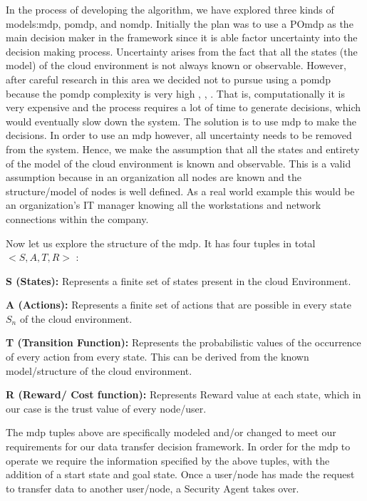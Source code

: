In the process of
developing the algorithm, we have explored three kinds of models:\gls{mdp},
\gls{pomdp}, and \gls{nomdp}. Initially the plan was to use a PO\gls{mdp} as the 
main decision maker in the
framework since it is able factor uncertainty into the decision making process.
Uncertainty arises from the fact that all the states (the model) of the cloud
environment is not always known or observable. However, after careful research
in this area we decided not to pursue using a \gls{pomdp} because the
\gls{pomdp} complexity
is very high \autocite{LeslieP.Kaelbling1998}, \autocite{Zilberman},
\autocite{DongNguyen2009}. 
That is, computationally it is very expensive and the
process requires a lot of time to generate decisions, which would eventually
slow down the system. The solution is to use \gls{mdp} to make the decisions. In order
to use an \gls{mdp} however, all uncertainty needs to be removed from the system.
Hence, we make the assumption that all the states and entirety of the model of
the cloud environment is known and observable. This is a valid assumption
because in an organization all nodes are known and the structure/model of nodes
is well defined. As a real world example this would be an organization's IT
manager knowing all the workstations and network connections within the company.

Now let us explore the structure of the \gls{mdp}. It
has four tuples in total $< S, A, T, R >$ \autocite{QimingHe2000}:
\begin{description}
    \item{\textbf{S (States):}} Represents a finite set of states present in the cloud Environment.
    \item{\textbf{A (Actions):}} Represents a finite set of actions that are possible in
        every state $S_n$ of the cloud environment.
    \item{\textbf{T (Transition Function):}} Represents the probabilistic values of the occurrence of every action from every state. This can be derived from the known model/structure of the cloud environment.
    \item{\textbf{R (Reward/ Cost function):}} Represents Reward value at each state, which
    in our case is the trust value of every node/user.  
\end{description}
The \gls{mdp} tuples above are
specifically modeled and/or changed to meet our requirements for our data
transfer decision framework. In order for the \gls{mdp} to operate we require the
information specified by the above tuples, with the addition of a start
state and goal state. Once a user/node has made the request to transfer data
to another user/node, a Security Agent takes over. 

